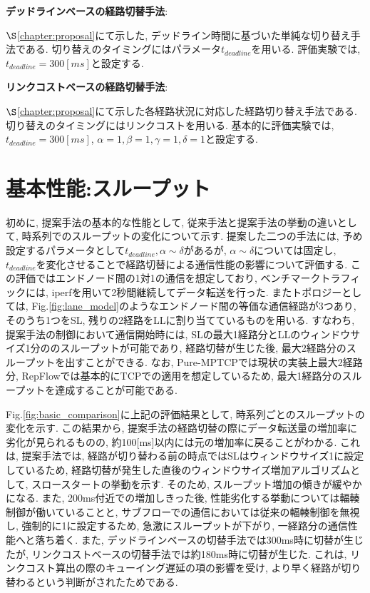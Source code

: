 {\bf デッドラインベースの経路切替手法}: 

$\S$\ref{chapter:proposal}にて示した,
デッドライン時間に基づいた単純な切り替え手法である.
切り替えのタイミングにはパラメータ$t_{deadline}$を用いる. 
評価実験では, $t_{deadline}=300[ms]$と設定する.

{\bf リンクコストベースの経路切替手法}: 

$\S$\ref{chapter:proposal}にて示した各経路状況に対応した経路切り替え手法である. 
切り替えのタイミングにはリンクコストを用いる. 
基本的に評価実験では, $t_{deadline}=300[ms]$, $\alpha=1, \beta=1, \gamma=1,
\delta=1$と設定する.

\section{基本性能:スループット}
初めに, 提案手法の基本的な性能として, 従来手法と提案手法の挙動の違いとして, 時系列でのスループットの変化について示す.  
提案した二つの手法には, 予め設定するパラメータとして$t_{deadline}, \alpha \sim \delta$があるが, $\alpha
\sim \delta$については固定し, $t_{deadline}$を変化させることで経路切替による通信性能の影響について評価する. 
この評価ではエンドノード間の1対1の通信を想定しており, ベンチマークトラフィックには,
iperfを用いて2秒間継続してデータ転送を行った. 
またトポロジーとしては, Fig.\ref{fig:lane_model}のようなエンドノード間の等価な通信経路が3つあり, そのうち1つをSL,
残りの2経路をLLに割り当てているものを用いる.
すなわち, 提案手法の制御において通信開始時には, SLの最大1経路分とLLのウィンドウサイズ1分ののスループットが可能であり, 経路切替が生じた後,
最大2経路分のスループットを出すことができる.
なお, Pure-MPTCPでは現状の実装上最大2経路分, RepFlowでは基本的にTCPでの適用を想定しているため,
最大1経路分のスループットを達成することが可能である. 

Fig.\ref{fig:basic_comparison}に上記の評価結果として, 時系列ごとのスループットの変化を示す. 
この結果から, 提案手法の経路切替の際にデータ転送量の増加率に劣化が見られるものの, 約100[ms]以内には元の増加率に戻ることがわかる. 
これは, 提案手法では, 経路が切り替わる前の時点ではSLはウィンドウサイズ1に設定しているため,
経路切替が発生した直後のウィンドウサイズ増加アルゴリズムとして, スロースタートの挙動を示す. 
そのため, スループット増加の傾きが緩やかになる. 
また, 200ms付近での増加しきった後, 性能劣化する挙動については輻輳制御が働いていることと,
サブフローでの通信においては従来の輻輳制御を無視し, 強制的に1に設定するため, 急激にスループットが下がり, 一経路分の通信性能へと落ち着く. 
また, デッドラインベースの切替手法では300ms時に切替が生じたが, リンクコストベースの切替手法では約180ms時に切替が生じた. 
これは, リンクコスト算出の際のキューイング遅延の項の影響を受け, より早く経路が切り替わるという判断がされたためである. 
% 


